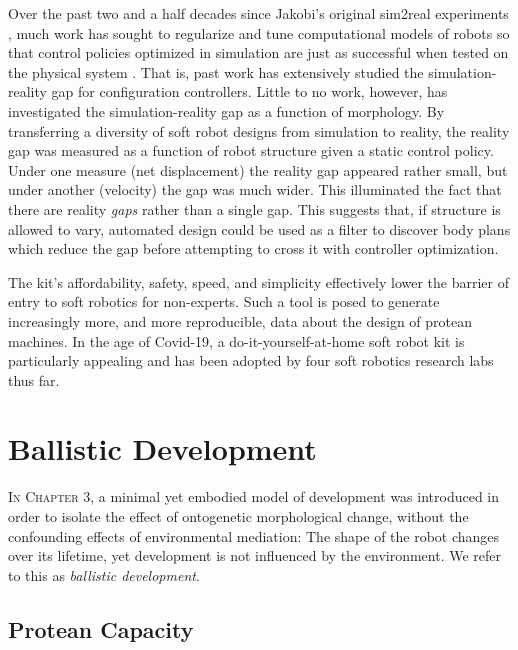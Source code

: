 Over the past two and a half decades since Jakobi's original sim2real experiments \cite{jakobi1995noise},
much work has sought to regularize and tune computational models of robots
so that control policies optimized in simulation are just as successful when tested on the physical system \cite{bongard2006resilient,hwangbo2019learning}.
That is, past work has extensively studied the simulation-reality gap for configuration controllers.
Little to no work, however, has investigated the simulation-reality gap as a function of morphology.
By transferring a diversity of soft robot designs from simulation to reality, the reality gap was measured as a function of robot structure given a static control policy.
Under one measure (net displacement) the reality gap appeared rather small, but under another (velocity) the gap was much wider.
This illuminated the fact that there are reality \textit{gaps} rather than a single gap.
This suggests that, if structure is allowed to vary, automated design could be used as a filter to discover body plans which reduce the gap before attempting to cross it with controller optimization.

The kit's affordability, safety, speed, and simplicity effectively lower the barrier of entry to soft robotics for non-experts.
Such a tool is posed to generate increasingly more, and more reproducible, data about the design of protean machines.
In the age of Covid-19, a do-it-yourself-at-home soft robot kit 
is particularly appealing and has been adopted by four soft robotics research labs thus far.



\section{Ballistic Development}


\textsc{In Chapter 3,}
a minimal yet embodied model of development was introduced in order to isolate the effect of ontogenetic morphological change,
without the confounding effects of environmental mediation:
The shape of the
robot changes over its lifetime, yet development is not influenced
by the environment.
We refer to this as \textit{ballistic development}.


\subsection{Protean Capacity}

